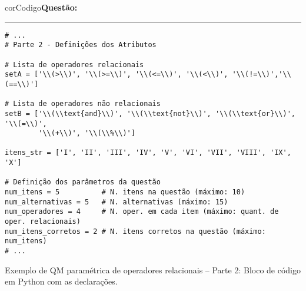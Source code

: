 \begin{listing}[!ht]
    \begin{myboxCode}{corCodigo}{\textbf{Questão: }}\vspace{3mm}
    \hrule
    \begin{verbatim}
# ...
# Parte 2 - Definições dos Atributos

# Lista de operadores relacionais
setA = ['\\(>\\)', '\\(>=\\)', '\\(<=\\)', '\\(<\\)', '\\(!=\\)','\\(==\\)']

# Lista de operadores não relacionais
setB = ['\\(\\text{and}\\)', '\\(\\text{not}\\)', '\\(\\text{or}\\)', '\\(=\\)', 
        '\\(+\\)', '\\(\\%\\)']

itens_str = ['I', 'II', 'III', 'IV', 'V', 'VI', 'VII', 'VIII', 'IX', 'X']

# Definição dos parâmetros da questão
num_itens = 5          # N. itens na questão (máximo: 10)
num_alternativas = 5   # N. alternativas (máximo: 15)
num_operadores = 4     # N. oper. em cada item (máximo: quant. de oper. relacionais)
num_itens_corretos = 2 # N. itens corretos na questão (máximo: num_itens)
# ...
\end{verbatim}
\end{myboxCode}
\caption{Exemplo de QM paramétrica de operadores relacionais -- Parte 2: Bloco de código em Python com as declarações.}
\label{lst:questaoQM_Extra1_parte2}
\end{listing}

